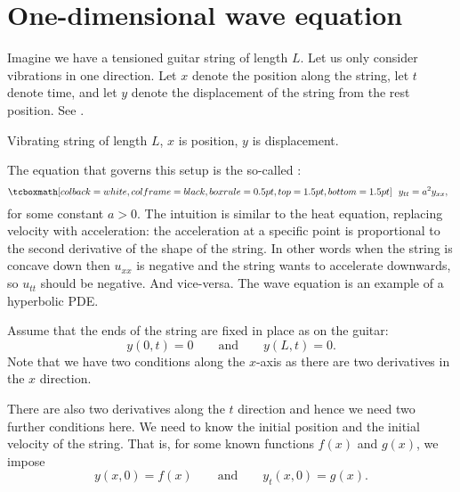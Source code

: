 
\sectionnewpage
\section{One-dimensional wave equation} \label{we:section}


Imagine we have a tensioned guitar string of length $L$.  Let us 
only consider vibrations in one direction.  Let
$x$ denote the position along the string, let $t$ denote time, and let $y$
denote the displacement of the string from the rest position.
See
.

\begin{myfig}
\capstart
{}
\caption{Vibrating string of length $L$, $x$ is position, $y$ is displacement.\label{we:vibstrfig}}
\end{myfig}

The equation that governs this setup is the so-called
\emph{}:
\begin{equation*}
\mybxbg{~~
y_{tt} =
a^2 y_{xx} ,
~~}
\end{equation*}
for some constant $a > 0$.
The intuition is similar to the heat equation, replacing velocity with
acceleration: the acceleration at a specific point is proportional to the second
derivative of the shape of the string.  In other words
when the string is
concave down then $u_{xx}$ is negative and the string wants to accelerate
downwards, so $u_{tt}$ should be negative.  And vice-versa.
The wave equation is an example of a hyperbolic PDE.

Assume that the ends of the string are fixed in place as on the guitar:
\begin{equation*}
y(0,t) = 0 \qquad \text{and} \qquad y(L,t) = 0.
\end{equation*}
Note that we have two conditions along the $x$-axis as there are
two derivatives in the $x$ direction.

There are also two derivatives along the $t$ direction and hence we need
two further conditions here.  We need to know the initial position
and the initial velocity of the string.  That is,
for some known functions $f(x)$ and $g(x)$, we impose
\begin{equation*}
y(x,0) = f(x)  \qquad \text{and} \qquad y_t (x,0) =
g(x) .
\end{equation*}

